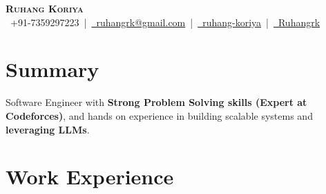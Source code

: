 \documentclass[a4paper,10pt]{article}
\begin{document}
\begin{center}
    \begin{minipage}{0.9\linewidth}
        \centering
        {\Huge \textbf{\scshape Ruhang Koriya}} \\[3pt]
        {\small 
        {\textcolor{black}{\faPhone}}~+91-7359297223 \,|\, 
        \href{mailto:ruhangrk@gmail.com}{{\textcolor{black}{\faEnvelope}}~ruhangrk@gmail.com} \,|\, 
        \href{https://www.linkedin.com/in/ruhang-koriya/}{{\textcolor{black}{\faLinkedin}}~ruhang-koriya} \,|\, 
        \href{https://github.com/Ruhangrk}{{\textcolor{black}{\faGithub}}~Ruhangrk}
        }
    \end{minipage}
\end{center}

\vspace{-0.5cm}

\section{Summary}
Software Engineer with \textbf{Strong Problem Solving skills (Expert at Codeforces)}, and hands on experience in building scalable systems and \textbf{leveraging LLMs}.
\vspace{-0.3cm}





\section{Work Experience}

\end{document}
